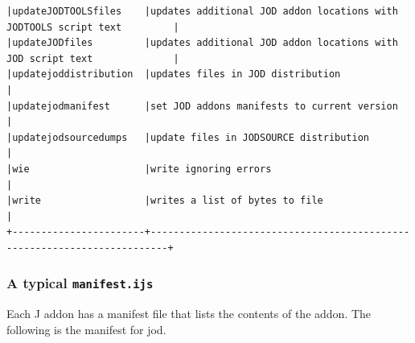 \documentclass[11pt,letter,landscape]{article}
\begin{document}
\begin{Verbatim}[commandchars=\\\{\}]
|updateJODTOOLSfiles    |updates additional JOD addon locations with JODTOOLS script text         |
|updateJODfiles         |updates additional JOD addon locations with JOD script text              |
|updatejoddistribution  |updates files in JOD distribution                                        |
|updatejodmanifest      |set JOD addons manifests to current version                              |
|updatejodsourcedumps   |update files in JODSOURCE distribution                                   |
|wie                    |write ignoring errors                                                    |
|write                  |writes a list of bytes to file                                           |
+-----------------------+-------------------------------------------------------------------------+

    \end{Verbatim}

    \subsubsection{\texorpdfstring{A typical
\texttt{manifest.ijs}}{A typical manifest.ijs}}\label{a-typical-manifest.ijs}

Each J addon has a manifest file that lists the contents of the addon.
The following is the manifest for jod.
\end{document}
